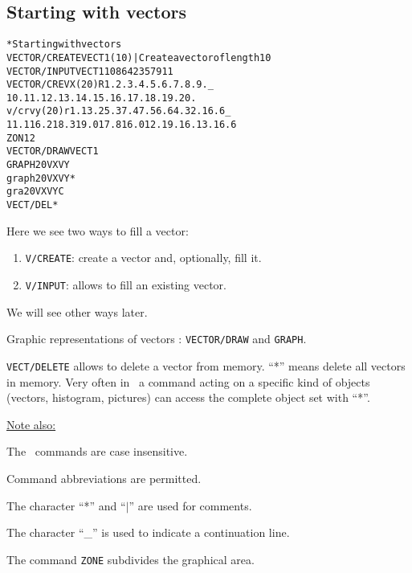\subsection{Starting with vectors}
\begin{alltt}
     * Starting with vectors
     VECTOR/CREATE VECT1(10)  | Create a vector of length 10
     VECTOR/INPUT VECT1 10 8 6 4 2 3 5 7 9 11
   VECTOR/CRE VX(20) R 1. 2. 3. 4. 5. 6. 7. 8. 9. _
      10. 11. 12. 13. 14. 15. 16. 17. 18. 19. 20.
      v/cr vy(20) r 1.1 3.2 5.3 7.4 7.5 6.6 4.3 2.1 6.6 _
      11.1 16.2 18.3 19.0 17.8 16.0 12.1 9.1 6.1 3.1 6.6
     ZON 1 2
     VECTOR/DRAW VECT1
   GRAPH 20 VX VY
   graph 20 VX VY *
     gra 20 VX VY C
     VECT/DEL *
\end{alltt} 
\begin{DinglistE}
\item Here we see two ways to fill a vector:
\begin{enumerate}
   \item {\tt V/CREATE}: create a vector and, optionally, fill it.
   \item {\tt V/INPUT}: allows to fill an existing vector.
\end{enumerate}
We will see other ways later.
\item Graphic representations of vectors : {\tt VECTOR/DRAW} and
      {\tt GRAPH}.  
\item {\tt VECT/DELETE} allows to delete a vector from memory. ``*'' means
      delete all vectors in memory. Very often in \PAW\ a command acting
      on a specific kind of objects (vectors, histogram, pictures) can
      access the complete object set with ``*''. 

\underline{Note also:}

\item The \PAW\ commands are case insensitive.
\item Command abbreviations are permitted.
\item The character ``*'' and ``$\mid$'' are used for comments.
\item The character ``\_'' is used to indicate a continuation line.
\item The command {\tt ZONE} subdivides the graphical area.
\end{DinglistE}

\clearpage

